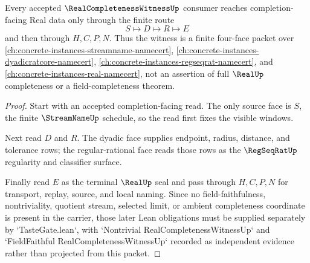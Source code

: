 \begin{theorem}
\label{thm:real-completeness-witness-four-face-route}
Every accepted $\RealCompletenessWitnessUp$ consumer reaches completion-facing Real data only through the finite route
$$
S \longmapsto D \longmapsto R \longmapsto E
$$
and then through $H,C,P,N$. Thus the witness is a finite four-face packet over \autoref{ch:concrete-instances-streamname-namecert}, \autoref{ch:concrete-instances-dyadicratcore-namecert}, \autoref{ch:concrete-instances-regseqrat-namecert}, and \autoref{ch:concrete-instances-real-namecert}, not an assertion of full $\RealUp$ completeness or a field-completeness theorem.
\end{theorem}
\begin{proof}
Start with an accepted completion-facing read. The only source face is $S$, the finite $\StreamNameUp$ schedule, so the read first fixes the visible windows.

Next read $D$ and $R$. The dyadic face supplies endpoint, radius, distance, and tolerance rows; the regular-rational face reads those rows as the $\RegSeqRatUp$ regularity and classifier surface.

Finally read $E$ as the terminal $\RealUp$ seal and pass through $H,C,P,N$ for transport, replay, source, and local naming. Since no field-faithfulness, nontriviality, quotient stream, selected limit, or ambient completeness coordinate is present in the carrier, those later Lean obligations must be supplied separately by `TasteGate.lean`, with `Nontrivial RealCompletenessWitnessUp` and `FieldFaithful RealCompletenessWitnessUp` recorded as independent evidence rather than projected from this packet.
\end{proof}




